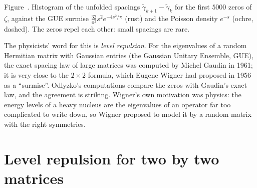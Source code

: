 \begin{center}
\label{moments:fig:spacings}
\\[0.5em]
{\small Figure~\thefigure. Histogram of the unfolded spacings $\tilde\gamma_{k+1}-\tilde\gamma_k$ for the first $5000$ zeros of $\zeta$, against the GUE surmise
$\frac{32}{\pi^2}s^2e^{-4s^2/\pi}$ (rust) and the Poisson density $e^{-s}$ (ochre, dashed). The zeros repel each other: small spacings are rare.}
\end{center}

The physicists' word for this is \emph{level repulsion}. For the eigenvalues of a random Hermitian matrix with Gaussian entries (the Gaussian Unitary
Ensemble, GUE), the exact spacing law of large matrices was computed by Michel Gaudin in 1961; it is very close to the $2\times2$ formula, which Eugene
Wigner had proposed in 1956 as a ``surmise''. Odlyzko's computations compare the zeros with Gaudin's exact law, and the agreement is striking. Wigner's own motivation was physics: the energy levels of a heavy nucleus are the eigenvalues of an operator far too
complicated to write down, so Wigner proposed to model it by a random matrix with the right symmetries.

\section{Level repulsion for two by two matrices}

